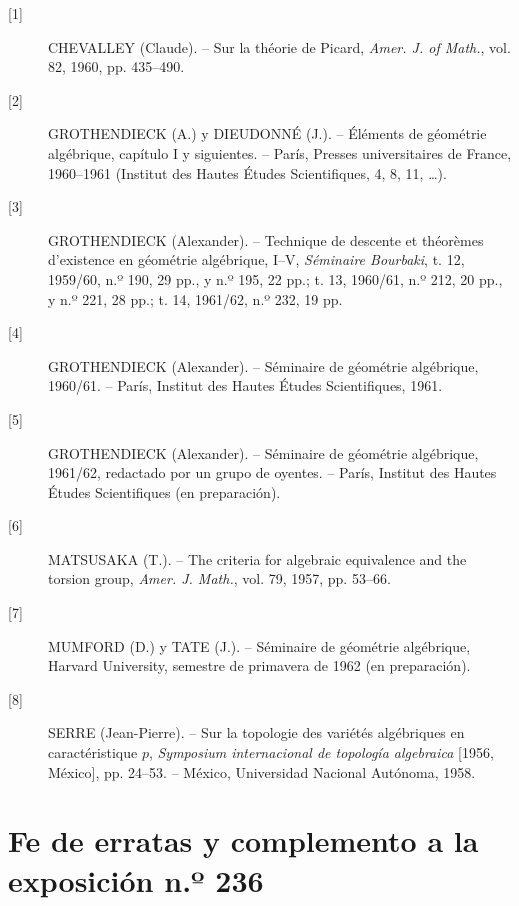 \documentclass[11pt,twoside,openany]{book}
\numberwithin{equation}{section}
\newcommand{\src}[1]{%
  \phantomsection\hypertarget{src:#1}{}%
  \marginpar{\raggedleft\footnotesize\sffamily #1}%
}
\theoremstyle{plain}
\theoremstyle{definition}
\theoremstyle{remark}
\newcommand{\FgaUnitKey}{frontmatter}
\renewcommand{\src}[1]{%
  \phantomsection\hypertarget{src:\FgaUnitKey:#1}{}%
  \marginpar{\raggedleft\footnotesize\sffamily #1}%
}
\theoremstyle{plain}
\theoremstyle{definition}
\theoremstyle{remark}
\begin{document}
\begin{description}
\item[{[1]}] CHEVALLEY (Claude). -- Sur la théorie de Picard,
\emph{Amer. J. of Math.}, vol. 82, 1960, pp. 435--490.

\item[{[2]}] GROTHENDIECK (A.) y DIEUDONNÉ (J.). -- Éléments de géométrie
algébrique, capítulo I y siguientes. -- París, Presses universitaires de
France, 1960--1961 (Institut des Hautes Études Scientifiques, 4, 8, 11,
\ldots).

\item[{[3]}] GROTHENDIECK (Alexander). -- Technique de descente et théorèmes
d'existence en géométrie algébrique, I--V, \emph{Séminaire Bourbaki}, t. 12,
1959/60, n.º 190, 29 pp., y n.º 195, 22 pp.; t. 13, 1960/61, n.º 212,
20 pp., y n.º 221, 28 pp.; t. 14, 1961/62, n.º 232, 19 pp.

\item[{[4]}] GROTHENDIECK (Alexander). -- Séminaire de géométrie algébrique,
1960/61. -- París, Institut des Hautes Études Scientifiques, 1961.

\item[{[5]}] GROTHENDIECK (Alexander). -- Séminaire de géométrie algébrique,
1961/62, redactado por un grupo de oyentes. -- París, Institut des Hautes Études
Scientifiques (en preparación).

\item[{[6]}] MATSUSAKA (T.). -- The criteria for algebraic equivalence and the
torsion group, \emph{Amer. J. Math.}, vol. 79, 1957, pp. 53--66.

\item[{[7]}] MUMFORD (D.) y TATE (J.). -- Séminaire de géométrie algébrique,
Harvard University, semestre de primavera de 1962 (en preparación).

\item[{[8]}] SERRE (Jean-Pierre). -- Sur la topologie des variétés algébriques
en caractéristique $p$, \emph{Symposium internacional de topología algebraica}
[1956, México], pp. 24--53. -- México, Universidad Nacional Autónoma, 1958.
\end{description}

\def\FgaUnitKey{e236}\clearpage
\chapter*{Fe de erratas y complemento a la exposición n.º 236}
\src{303}
\end{document}
